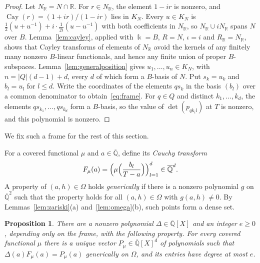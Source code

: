 \documentclass[10pt]{article}
\newtheorem{prop}[thm]{Proposition}
\theoremstyle{remark}
\newcommand{\R}{\mathbb R}
\newcommand{\Qbar}{\overline{\mathbb Q}}
\DeclareMathOperator{\Cay}{Cay}
\begin{document}
\begin{proof}
Let $N_\R=N\cap\R$. For $r\in N_\R$, the element $1-ir$ is nonzero, and $\Cay(r)=(1+ir)/(1-ir)$ lies in $K_N$. Every $u\in K_N$ is $\frac12(u+u^{-1})+i\cdot\frac1{2i}(u-u^{-1})$ with both coefficients in $N_\R$, so $N_\R\cup iN_\R$ spans $N$ over $B$. Lemma~\ref{lem:cayley}, applied with $\Bbbk=B$, $R=N$, $\iota=i$ and $R_\R=N_\R$, shows that Cayley transforms of elements of $N_\R$ avoid the kernels of any finitely many nonzero $B$-linear functionals, and hence any finite union of proper $B$-subspaces. Lemma~\ref{lem:generalposition} gives $u_1,\ldots,u_n\in K_N$, with $n=|Q|(d-1)+d$, every $d$ of which form a $B$-basis of $N$. Put $s_k=u_k$ and $b_l=u_l$ for $l\le d$. Write the coordinates of the elements $qs_k$ in the basis $(b_l)$ over a common denominator to obtain~\eqref{eq:frame}. For $q\in Q$ and distinct $k_1,\ldots,k_d$, the elements $qs_{k_1},\ldots,qs_{k_d}$ form a $B$-basis, so the value of $\det(p_{qk_il})$ at $T$ is nonzero, and this polynomial is nonzero.
\end{proof}

We fix such a frame for the rest of this section.

For a covered functional $\mu$ and $a\in\Qbar$, define its \emph{Cauchy transform}
\[
 F_\mu(a)=\Bigl(\mu\Bigl(\frac{b_l}{T-a}\Bigr)\Bigr)_{l=1}^d\in\Qbar^d.
\]
A property of $(a,h)\in\Omega$ holds \emph{generically} if there is a nonzero polynomial $g$ on $\Qbar^2$ such that the property holds for all $(a,h)\in\Omega$ with $g(a,h)\ne0$. By Lemmas~\ref{lem:zariski}(a) and~\ref{lem:omega}(b), such points form a dense set.

\begin{prop}\label{prop:rational}
There are a nonzero polynomial $\Delta\in\Qbar[X]$ and an integer $e\ge0$, depending only on the frame, with the following property. For every covered functional $\mu$ there is a unique vector $P_\mu\in\Qbar[X]^d$ of polynomials such that $\Delta(a)F_\mu(a)=P_\mu(a)$ generically on $\Omega$, and its entries have degree at most $e$.
\end{prop}
\end{document}

